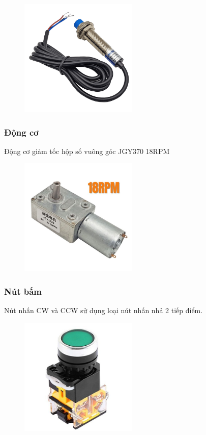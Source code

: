 \begin{figure}[H]
    \centering
    \includegraphics[width=0.5\textwidth]{pictures/Sensor.png}
\end{figure}



\subsubsection{Động cơ}
Động cơ giảm tốc hộp số vuông góc JGY370 18RPM
\begin{figure}[H]
    \centering
    \includegraphics[width=0.5\textwidth]{pictures/motor.png}
\end{figure}



\subsubsection{Nút bấm}
Nút nhấn CW và CCW sử dụng loại nút nhấn nhả 2 tiếp điểm.
\begin{figure}[H]
    \centering
    \includegraphics[width=0.5\textwidth]{pictures/button.png}
\end{figure}
\cleardoublepage
